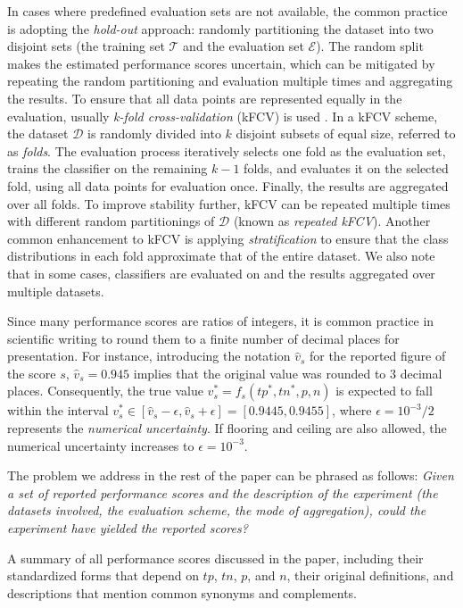 \documentclass[3p, times]{elsarticle}
\begin{document}
In cases where predefined evaluation sets are not available, the common practice is adopting the \emph{hold-out} approach: randomly partitioning the dataset into two disjoint sets (the training set $\mathcal{T}$ and the evaluation set $\mathcal{E}$).
The random split makes the estimated performance scores uncertain, which can be mitigated by repeating the random partitioning and evaluation multiple times and aggregating the results. To ensure that all data points are represented equally in the evaluation, usually \emph{k-fold cross-validation} (kFCV) is used \cite{cv1}.
In a kFCV scheme, the dataset $\mathcal{D}$ is randomly divided into $k$ disjoint subsets of equal size, referred to as \emph{folds}. The evaluation process iteratively selects one fold as the evaluation set, trains the classifier on the remaining $k-1$ folds, and evaluates it on the selected fold, using all data points for evaluation once. Finally, the results are aggregated over all folds. 
To improve stability further, kFCV can be repeated multiple times with different random partitionings of $\mathcal{D}$ (known as \emph{repeated kFCV}). Another common enhancement to kFCV is applying \emph{stratification} to ensure that the class distributions in each fold approximate that of the entire dataset. We also note that in some cases, classifiers are evaluated on and the results aggregated over multiple datasets.

Since many performance scores are ratios of integers, it is common practice in scientific writing to round them to a finite number of decimal places for presentation. For instance, introducing the notation $\hat{v}_s$ for the reported figure of the score $s$, $\hat{v}_s = 0.945$ implies that the original value was rounded to 3 decimal places. Consequently, the true value $v_s^{*} = f_s(tp^{*}, tn^{*}, p, n)$ is expected to fall within the interval $v_s^{*} \in [\hat{v}_s - \epsilon, \hat{v}_s + \epsilon] = [0.9445, 0.9455]$, where $\epsilon = 10^{-3}/2$ represents the \emph{numerical uncertainty}. If flooring and ceiling are also allowed, the numerical uncertainty increases to $\epsilon = 10^{-3}$.

The problem we address in the rest of the paper can be phrased as follows: \emph{Given a set of reported performance scores and the description of the experiment (the datasets involved, the evaluation scheme, the mode of aggregation), could the experiment have yielded the reported scores?}

\begin{table}
\caption{A summary of all performance scores discussed in the paper, including their standardized forms that depend on $tp$, $tn$, $p$, and $n$, their original definitions, and descriptions that mention common synonyms and complements.}
\label{tab:scores}
\begin{scriptsize}
\begingroup
\renewcommand{\arraystretch}{3.0}

\endgroup
\end{scriptsize}
\end{table}
\end{document}

